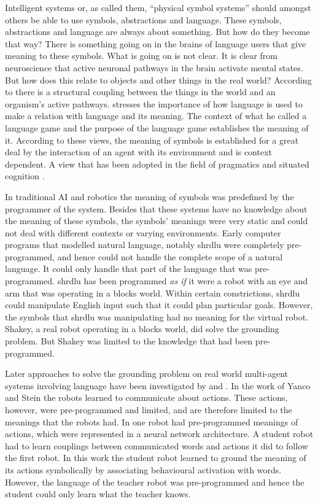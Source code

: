 Intelligent systems or, as \citet{newell:1980} called them, ``physical symbol systems'' should amongst others be able to use symbols, abstractions and language. These symbols, abstractions and language are always about something. But how do they become that way? There is something going on in the brains of language users that give meaning to these symbols. What is going on is not clear. It is clear from neuroscience that active neuronal pathways in the brain activate mental states. But how does this relate to objects and other things in the real world? According to \citet{maturanavarela:1992} there is a structural coupling between the things in the world and an organism's active pathways. \citet{wittgenstein:1958} stresses the importance of how language is used to make a relation with language and its meaning. The context of what he called a language game and the purpose of the language game establishes the meaning of it. According to these views, the meaning of symbols is established for a great deal by the interaction of an agent with its environment and is context dependent. A view that has been adopted in the field of pragmatics and situated cognition \citep{clancey:1997}.

In traditional AI and robotics the meaning of symbols was predefined by the programmer of the system. Besides that these systems have no knowledge about the meaning of these symbols, the symbols' meanings were very static and could not deal with different contexts or varying environments. Early computer programs that modelled natural language, notably {\sc shrdlu} \citep{winograd:1972} were completely pre-programmed, and hence could not handle the complete scope of a natural language. It could only handle that part of the language that was pre-programmed. {\sc shrdlu} has been programmed {\em as if} it were a robot with an eye and arm that was operating in a blocks world. Within certain constrictions, {\sc shrdlu} could manipulate English input such that it could plan particular goals. However, the symbols that {\sc shrdlu} was manipulating had no meaning for the virtual robot. Shakey, a real robot operating in a blocks world, did solve the grounding problem. But Shakey was limited to the knowledge that had been pre-programmed.

Later approaches to solve the grounding problem on real world multi-agent systems involving language have been investigated by \citet{yancostein} and \citet{billard:1997a}. In the work of Yanco and Stein the robots learned to communicate about actions. These actions, however, were pre-programmed and limited, and are therefore limited to the meanings that the robots had. In \citet{billard:1997a} one robot had pre-programmed meanings of actions, which were represented in a neural network architecture. A student robot had to learn couplings between communicated words and actions it did to follow the first robot. In this work the student robot learned to ground the meaning of its actions symbolically by associating behavioural activation with words. However, the language of the teacher robot was pre-programmed and hence the student could only learn what the teacher knows.

